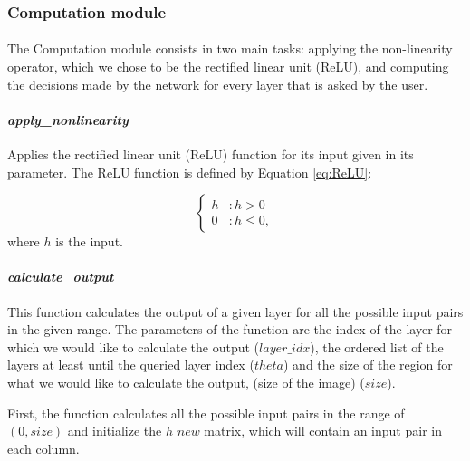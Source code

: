 \documentclass[a4paper]{article}
\begin{document}
\subsubsection{Computation module}
\paragraph{}The Computation module consists in two main tasks: applying the non-linearity operator, which we chose to be the rectified linear unit (ReLU), and computing the decisions made by the network for every layer that is asked by the user.


\paragraph{\textit{apply\_nonlinearity}}Applies the rectified linear unit (ReLU) function for its input given in its parameter. The ReLU function is defined by Equation \ref{eq:ReLU}:

\begin{equation}
\left\{
  \begin{array}{lr}
  	h & : h > 0\\
    0 & : h \leq 0,
  \end{array}
\right.
\label{eq:ReLU}
\end{equation}
where $h$ is the input.

\paragraph{\textit{calculate\_output}}This function calculates the output of a given layer for all the possible input pairs in the given range. The parameters of the function are the index of the layer for which we would like to calculate the output ($layer\_idx$), the ordered list of the layers at least until the queried layer index ($theta$) and the size of the region for what we would like to calculate the output, (size of the image) ($size$).

First, the function calculates all the possible input pairs in the range of $(0, size)$ %
and initialize the $h\_new$ matrix, which will contain an input pair in each column.
\end{document}
